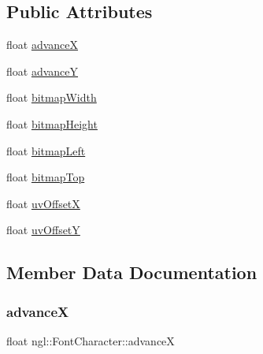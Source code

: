 \subsection*{Public Attributes}
\begin{DoxyCompactItemize}
\item 
float \mbox{\hyperlink{structngl_1_1_font_character_a370c3434904a2780baf53437ceec105c}{advanceX}}
\item 
float \mbox{\hyperlink{structngl_1_1_font_character_a74c4b4157d486c475d1bad4c7e4f9ce9}{advanceY}}
\item 
float \mbox{\hyperlink{structngl_1_1_font_character_a139982b3d55bd6268b48eb76da505d5d}{bitmap\+Width}}
\item 
float \mbox{\hyperlink{structngl_1_1_font_character_a97795f2107748f5092ea510005c0f98d}{bitmap\+Height}}
\item 
float \mbox{\hyperlink{structngl_1_1_font_character_a1a363dfc5514a139a4768855a389c033}{bitmap\+Left}}
\item 
float \mbox{\hyperlink{structngl_1_1_font_character_a783c0f1e8285c4b360d579a43dce6110}{bitmap\+Top}}
\item 
float \mbox{\hyperlink{structngl_1_1_font_character_ab75d139694d86cdd6607ae43c042ea08}{uv\+OffsetX}}
\item 
float \mbox{\hyperlink{structngl_1_1_font_character_a4dd5ecb725772a4f44fd31bc11cfe954}{uv\+OffsetY}}
\end{DoxyCompactItemize}


\subsection{Member Data Documentation}
\mbox{\label{structngl_1_1_font_character_a370c3434904a2780baf53437ceec105c}} 
\subsubsection{\texorpdfstring{advanceX}{advanceX}}
{\footnotesize\ttfamily float ngl\+::\+Font\+Character\+::advanceX}

\mbox{\label{structngl_1_1_font_character_a74c4b4157d486c475d1bad4c7e4f9ce9}} 
